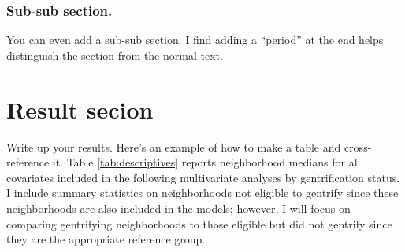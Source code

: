\documentclass[
]{DissertateCUNY}
\begin{document}
\hypertarget{sub-sub-section.}{%
\subsubsection{Sub-sub section.}\label{sub-sub-section.}}

You can even add a sub-sub section. I find adding a ``period'' at the
end helps distinguish the section from the normal text.

\hypertarget{result-secion}{%
\section{Result secion}\label{result-secion}}

Write up your results. Here's an example of how to make a table and
cross-reference it. Table \ref{tab:descriptives} reports neighborhood
medians for all covariates included in the following multivariate
analyses by gentrification status. I include summary statistics on
neighborhoods not eligible to gentrify since these neighborhoods are
also included in the models; however, I will focus on comparing
gentrifying neighborhoods to those eligible but did not gentrify since
they are the appropriate reference group.
\end{document}
